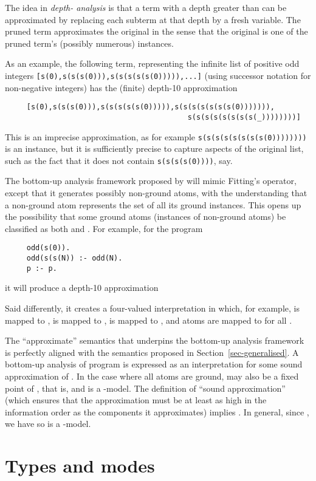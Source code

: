 \documentclass{tlp}
\begin{document}
The idea in \emph{depth- analysis} is that a
term with a depth greater than  can be approximated by replacing
each subterm at that depth by a fresh variable.
The pruned term approximates the original in the sense that the
original is one of the pruned term's (possibly numerous) instances.

As an example, the following term, representing the
infinite list of positive odd integers
    \verb![s(0),s(s(s(0))),s(s(s(s(s(0))))),...]!
(using successor notation for non-negative integers)
has the (finite) depth-10 approximation
\begin{verbatim}
     [s(0),s(s(s(0))),s(s(s(s(s(0))))),s(s(s(s(s(s(s(0))))))),
                                          s(s(s(s(s(s(s(s(_))))))))]
\end{verbatim}
This is an imprecise approximation, as for example \verb!s(s(s(s(s(s(s(s(0))))))))!
is an instance,
but it is sufficiently precise to capture aspects of the original list,
such as the fact that it does not contain \verb!s(s(s(s(0))))!, say.

The bottom-up analysis framework proposed by  
will mimic Fitting's  operator, except that
it generates possibly non-ground atoms, with the understanding
that a non-ground atom represents the set of all its ground instances.
This opens up the possibility that some ground atoms (instances of
non-ground atoms) be classified as both  and .
For example, for the program
\begin{verbatim}
     odd(s(0)).
     odd(s(s(N)) :- odd(N).
     p :- p.
\end{verbatim}
it will produce a depth-10 approximation

Said differently, it creates a four-valued interpretation in which,
for example,
 is mapped to , 
 is mapped to , 
 is mapped to , 
and atoms  are mapped to 
 for all .

The ``approximate'' semantics that underpins the bottom-up analysis 
framework is perfectly aligned with the semantics proposed in 
Section~\ref{sec-generalised}.
A bottom-up analysis of program  is expressed as an interpretation  for some sound approximation  of . In the
case where all atoms are ground,  may also be a fixed point of ,
that is,  and  is a -model.  The definition of
``sound approximation'' (which ensures that the approximation must be
at least as high in the information order as the components it approximates)
implies .  In general, since , we have  so  is a
-model.

\section{Types and modes}
\label{sec-modes}
\end{document}
